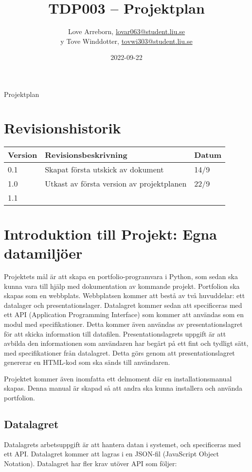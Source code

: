 \documentclass{mall}
\author{Love Arreborn, \url{lovar063@student.liu.se}\\y
  Tove Winddotter, \url{tovwi303@student.liu.se}}
\title{TDP003 -- Projektplan}
\date{2022-09-22}
\begin{document}
\projectpage

\title{}{Projektplan}
\pagebreak
\section{Revisionshistorik}
\begin{table}[ht]
\begin{tabularx}{\textwidth}{|l|X|l|}
\hline
Version & Revisionsbeskrivning                      & Datum \\ \hline
0.1     & Skapat första utskick av dokument        & 14/9       \\ \hline
1.0     & Utkast av första version av projektplanen & 22/9       \\ \hline
1.1     &                                           &       \\ \hline
\end{tabularx}
\end{table}

\section{Introduktion till Projekt: Egna datamiljöer}

Projektets mål är att skapa en portfolio-programvara i Python, som sedan ska kunna vara till hjälp med dokumentation av kommande projekt. Portfolion ska skapas som en webbplats. Webbplatsen kommer att bestå av två huvuddelar: ett datalager och presentationslager. Datalagret kommer sedan att specificeras med ett API (Application Programming Interface) som kommer att användas som en modul med specifikationer. Detta kommer även användas av presentationslagret för att skicka information till datafilen. Presentationslagrets uppgift är att avbilda den informationen som användaren har begärt på ett fint och tydligt sätt, med specifikationer från datalagret. Detta görs genom att presentationslagret genererar en HTML-kod som ska sänds till användaren.

Projektet kommer även inomfatta ett delmoment där en installationsmanual skapas. Denna manual är skapad så att andra ska kunna installera och använda portfolion.


\subsection*{Datalagret}
Datalagrets arbetsuppgift är att hantera datan i systemet, och specificeras med ett API. Datalagret kommer att lagras i en JSON-fil (JavaScript Object Notation).
Datalagret har fler krav utöver API som följer:
\end{document}
